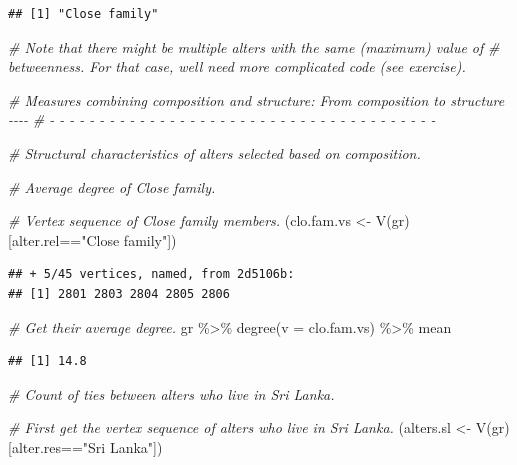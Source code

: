 \documentclass[
]{book}
\newenvironment{Shaded}{\begin{snugshade}}{\end{snugshade}}
\newcommand{\AttributeTok}[1]{\textcolor[rgb]{0.77,0.63,0.00}{#1}}
\newcommand{\CommentTok}[1]{\textcolor[rgb]{0.56,0.35,0.01}{\textit{#1}}}
\newcommand{\FunctionTok}[1]{\textcolor[rgb]{0.00,0.00,0.00}{#1}}
\newcommand{\NormalTok}[1]{#1}
\newcommand{\OtherTok}[1]{\textcolor[rgb]{0.56,0.35,0.01}{#1}}
\newcommand{\SpecialCharTok}[1]{\textcolor[rgb]{0.00,0.00,0.00}{#1}}
\newcommand{\StringTok}[1]{\textcolor[rgb]{0.31,0.60,0.02}{#1}}
\begin{document}
\begin{verbatim}
## [1] "Close family"
\end{verbatim}

\begin{Shaded}
\begin{Highlighting}[]
\CommentTok{\# Note that there might be multiple alters with the same (maximum) value of }
\CommentTok{\# betweenness. For that case, we\textquotesingle{}ll need more complicated code (see exercise).}

\CommentTok{\# Measures combining composition and structure: From composition to structure {-}{-}{-}{-}}
\CommentTok{\# {-} {-} {-} {-} {-} {-} {-} {-} {-} {-} {-} {-} {-} {-} {-} {-} {-} {-} {-} {-} {-} {-} {-} {-} {-} {-} {-} {-} {-} {-} {-} {-} {-} {-} {-} {-} {-} {-} {-} }

\CommentTok{\# Structural characteristics of alters selected based on composition.}

\CommentTok{\# Average degree of Close family.}

\CommentTok{\# Vertex sequence of Close family members.}
\NormalTok{(clo.fam.vs }\OtherTok{\textless{}{-}} \FunctionTok{V}\NormalTok{(gr)[alter.rel}\SpecialCharTok{==}\StringTok{"Close family"}\NormalTok{])}
\end{Highlighting}
\end{Shaded}

\begin{verbatim}
## + 5/45 vertices, named, from 2d5106b:
## [1] 2801 2803 2804 2805 2806
\end{verbatim}

\begin{Shaded}
\begin{Highlighting}[]
\CommentTok{\# Get their average degree.}
\NormalTok{gr }\SpecialCharTok{\%\textgreater{}\%}
  \FunctionTok{degree}\NormalTok{(}\AttributeTok{v =}\NormalTok{ clo.fam.vs) }\SpecialCharTok{\%\textgreater{}\%} 
\NormalTok{  mean}
\end{Highlighting}
\end{Shaded}

\begin{verbatim}
## [1] 14.8
\end{verbatim}

\begin{Shaded}
\begin{Highlighting}[]
\CommentTok{\# Count of ties between alters who live in Sri Lanka.}

\CommentTok{\# First get the vertex sequence of alters who live in Sri Lanka.}
\NormalTok{(alters.sl }\OtherTok{\textless{}{-}} \FunctionTok{V}\NormalTok{(gr)[alter.res}\SpecialCharTok{==}\StringTok{"Sri Lanka"}\NormalTok{])}
\end{Highlighting}
\end{Shaded}
\end{document}
